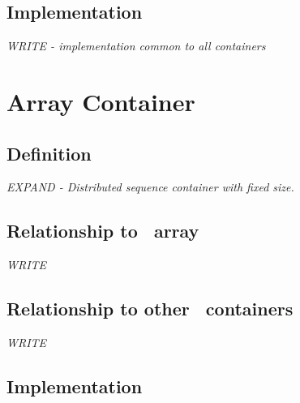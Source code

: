 \vspace{0.4cm}

\subsection{Implementation}

\textit{WRITE - implementation common to all containers}



\section{ Array Container} \label{sec-ary-cont}

\subsection{Definition}

\textit{EXPAND - Distributed sequence container with fixed size.}

\subsection{Relationship to \stl\ array}

\textit{WRITE}

\subsection{Relationship to other \stapl\ containers}

\textit{WRITE}

\subsection{Implementation}

